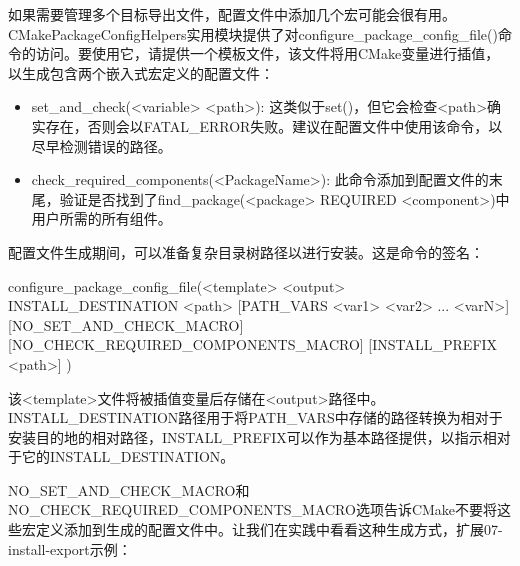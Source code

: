 
如果需要管理多个目标导出文件，配置文件中添加几个宏可能会很有用。CMakePackageConfigHelpers实用模块提供了对configure\_package\_config\_file()命令的访问。要使用它，请提供一个模板文件，该文件将用CMake变量进行插值，以生成包含两个嵌入式宏定义的配置文件：

\begin{itemize}
\item
set\_and\_check(<variable> <path>): 这类似于set()，但它会检查<path>确实存在，否则会以FATAL\_ERROR失败。建议在配置文件中使用该命令，以尽早检测错误的路径。

\item
check\_required\_components(<PackageName>): 此命令添加到配置文件的末尾，验证是否找到了find\_package(<package> REQUIRED <component>)中用户所需的所有组件。
\end{itemize}

配置文件生成期间，可以准备复杂目录树路径以进行安装。这是命令的签名：

\begin{shell}
configure_package_config_file(<template> <output>
    INSTALL_DESTINATION <path>
    [PATH_VARS <var1> <var2> ... <varN>]
    [NO_SET_AND_CHECK_MACRO]
    [NO_CHECK_REQUIRED_COMPONENTS_MACRO]
    [INSTALL_PREFIX <path>]
)
\end{shell}

该<template>文件将被插值变量后存储在<output>路径中。INSTALL\_DESTINATION路径用于将PATH\_VARS中存储的路径转换为相对于安装目的地的相对路径，INSTALL\_PREFIX可以作为基本路径提供，以指示相对于它的INSTALL\_DESTINATION。

NO\_SET\_AND\_CHECK\_MACRO和NO\_CHECK\_REQUIRED\_COMPONENTS\_MACRO选项告诉CMake不要将这些宏定义添加到生成的配置文件中。让我们在实践中看看这种生成方式，扩展07-install-export示例：



